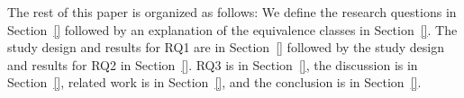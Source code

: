 The rest of this paper is organized as follows:
We define the research questions in Section~\ref{} followed by an explanation of the equivalence classes in Section~\ref{}. The study design and results for RQ1 are in Section~\ref{} followed by the study design and results for RQ2 in Section~\ref{}. RQ3 is in Section~\ref{}, the discussion is in Section~\ref{}, related work is in Section~\ref{}, and the conclusion is in Section~\ref{}. 
%
